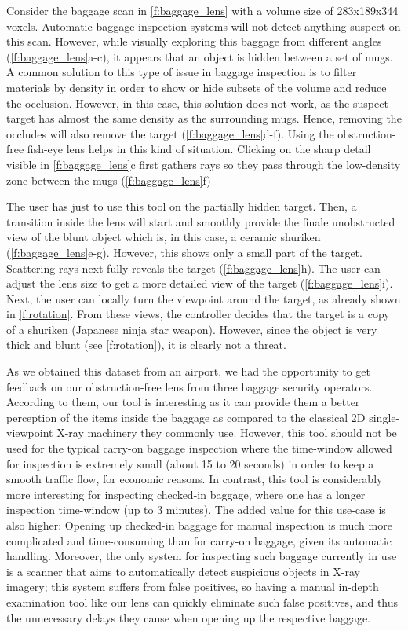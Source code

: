 Consider the baggage scan in \autoref{f:baggage_lens} with a volume size of 283x189x344 voxels. Automatic baggage inspection systems will not detect anything suspect on this scan. However, while visually exploring this baggage from different angles (\autoref{f:baggage_lens}a-c), it appears that an object is hidden between a set of mugs. A common solution to this type of issue in baggage inspection is to filter materials by density in order to show or hide subsets of the volume and reduce the occlusion. However, in this case, this solution does not work, as the suspect target has almost the same density as the surrounding mugs. Hence, removing the occludes will also remove the target (\autoref{f:baggage_lens}d-f). Using the obstruction-free fish-eye lens helps in this kind of situation. Clicking on the sharp detail visible in \autoref{f:baggage_lens}c first gathers rays so they pass through the low-density zone between the mugs (\autoref{f:baggage_lens}f)

The user has just to use this tool on the partially hidden target. Then, a transition inside the lens will start and smoothly provide the finale unobstructed view of the blunt object which is, in this case, a ceramic shuriken (\autoref{f:baggage_lens}e-g). However, this shows only a small part of the target. Scattering rays next fully reveals the target (\autoref{f:baggage_lens}h). The user can adjust the lens size to get a more detailed view of the target (\autoref{f:baggage_lens}i). Next, the user can locally turn the viewpoint around the target, as already shown in \autoref{f:rotation}. From these views, the controller decides that the target is a copy of a shuriken (Japanese ninja star weapon). However, since the object is very thick and blunt (see \autoref{f:rotation}), it is clearly not a threat.

As we obtained this dataset from an airport, we had the opportunity to get feedback on our obstruction-free lens from three baggage security operators. According to them, our tool is interesting as it can provide them a better perception of the items inside the baggage as compared to the classical 2D single-viewpoint X-ray machinery they commonly use. However, this tool should not be used for the typical carry-on baggage inspection where the time-window allowed for inspection is extremely small (about 15 to 20 seconds) in order to keep a smooth traffic flow, for economic reasons. In contrast, this tool is considerably more interesting for inspecting checked-in baggage, where one has a longer inspection time-window (up to 3 minutes). The added value for this use-case is also higher: Opening up checked-in baggage for manual inspection is much more complicated and time-consuming than for carry-on baggage, given its automatic handling. Moreover, the only system for inspecting such baggage currently in use is a scanner that aims to automatically detect suspicious objects in X-ray imagery; this system suffers from false positives, so having a manual in-depth examination tool like our lens can quickly eliminate such false positives, and thus the unnecessary delays they cause when opening up the respective baggage.

